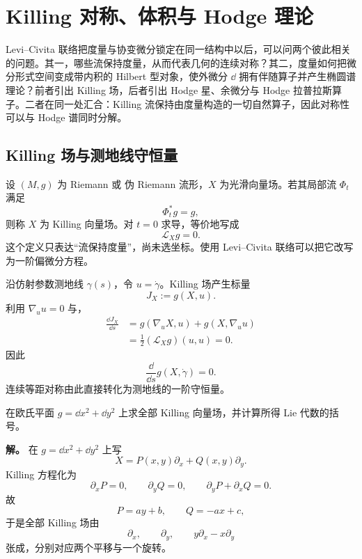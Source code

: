 \chapter{Killing 对称、体积与 Hodge 理论}

Levi--Civita 联络把度量与协变微分锁定在同一结构中以后，可以问两个彼此相关的问题。其一，哪些流保持度量，从而代表几何的连续对称？其二，度量如何把微分形式空间变成带内积的 Hilbert 型对象，使外微分 $\dd$ 拥有伴随算子并产生椭圆谱理论？前者引出 Killing 场，后者引出 Hodge 星、余微分与 Hodge 拉普拉斯算子。二者在同一处汇合：Killing 流保持由度量构造的一切自然算子，因此对称性可以与 Hodge 谱同时分解。

\section{Killing 场与测地线守恒量}

设 $(M,g)$ 为 Riemann 或 伪 Riemann 流形，$X$ 为光滑向量场。若其局部流 $\Phi_t$ 满足
\[
\Phi_t^*g=g,
\]
则称 $X$ 为 Killing 向量场。对 $t=0$ 求导，等价地写成
\begin{equation*}{\mathcal L_Xg=0.}
\end{equation*}
这个定义只表达“流保持度量”，尚未选坐标。使用 Levi--Civita 联络可以把它改写为一阶偏微分方程。

沿仿射参数测地线 $\gamma(s)$，令 $u=\dot\gamma$。Killing 场产生标量
\[
J_X:=g(X,u).
\]
利用 $\nabla_u u=0$ 与，
\[
\begin{aligned}
\frac{\dd J_X}{\dd s}
&=g(\nabla_uX,u)+g(X,\nabla_uu)\\
&=\frac12(\mathcal L_Xg)(u,u)=0.
\end{aligned}
\]
因此
\begin{equation*}{\frac{\dd}{\dd s}g(X,\dot\gamma)=0.}
\end{equation*}
连续等距对称由此直接转化为测地线的一阶守恒量。

\begin{exbox}
在欧氏平面 $g=\dd x^2+\dd y^2$ 上求全部 Killing 向量场，并计算所得 Lie 代数的括号。

\textbf{解。} 在 $g=\dd x^2+\dd y^2$ 上写
\[
X=P(x,y)\partial_x+Q(x,y)\partial_y.
\]
Killing 方程化为
\[
\partial_xP=0,
\qquad
\partial_yQ=0,
\qquad
\partial_yP+\partial_xQ=0.
\]
故
\[
P=ay+b,
\qquad
Q=-ax+c,
\]
于是全部 Killing 场由
\[
\partial_x,
\qquad
\partial_y,
\qquad
y\partial_x-x\partial_y
\]
张成，分别对应两个平移与一个旋转。
\end{exbox}

